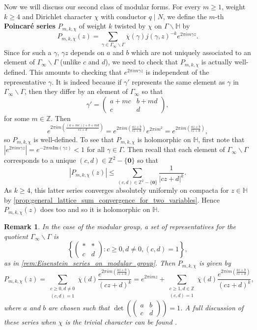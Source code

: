 \documentclass[12pt]{book}
\newtheorem{remark}{Remark}[section]
\theoremstyle{definition}\newframedtheorem{method}{Method}
\newcommand{\Z}{\mathbb{Z}}
\renewcommand{\H}{\mathbb{H}}
\newcommand{\g}{\gamma}
\newcommand{\G}{\Gamma}
\newcommand{\<}{\langle}
\renewcommand{\>}{\rangle}
\newcommand{\conj}{\overline}
\newcommand{\cchi}{\conj{\chi}}
\renewcommand{\Im}{\mathrm{Im}}
\newcommand{\GH}{\G\backslash\H}
\newcommand{\GG}{\G_{\infty}\backslash\G}
\begin{document}
      Now we will discuss our second class of modular forms. For every $m \ge 1$, weight $k \ge 4$ and Dirichlet character $\chi$ with conductor $q \mid N$, we define the $m$-th \textbf{Poincar\'e series} $P_{m,k,\chi}$ of weight $k$ twisted by $\chi$ on $\GH$ by
      \[
        P_{m,k,\chi}(z) = \sum_{\g \in \GG}\cchi(\g)j(\g,z)^{-k}e^{2\pi im\g z}.
      \]
      Since for such a $\g$, $\g z$ depends on $a$ and $b$ which are not uniquely associated to an element of $\GG$ (unlike $c$ and $d$), we need to check that $P_{m,k,\chi}$ is actually well-defined. This amounts to checking that $e^{2\pi im\g z}$ is independent of the representative $\g$. It is indeed because if $\g'$ represents the same element as $\g$ in $\GG$, then they differ by an element of $\G_{\infty}$ so that
      \[
        \g' = \begin{pmatrix} a+mc & b+md \\ c & d \end{pmatrix},
      \]
      for some $m \in \Z$. Then
      \[
        e^{2\pi im\left(\frac{(a+mc)z+b+md}{cz+d}\right)} = e^{2\pi im\left(\frac{az+b}{cz+d}\right)}e^{2\pi im^{2}} = e^{2\pi im\left(\frac{az+b}{cz+d}\right)},
      \]
      so $P_{m,k,\chi}$ is well-defined. To see that $P_{m,k,\chi}$ is holomorphic on $\H$, first note that $|e^{2\pi im\g z}| = e^{-2\pi m\Im(\g z)} < 1$ for all $\g \in \G$. Then recall that each element of $\GG$ corresponds to a unique $(c,d) \in \Z^{2}-\{\mathbf{0}\}$ so that
      \[
        |P_{m,k,\chi}(z)| \le \sum_{(c,d) \in \Z^{2}-\{\mathbf{0}\}}\frac{1}{|cz+d|^{k}}.
      \]
      As $k \ge 4$, this latter series converges absolutely uniformly on compacta for $z \in \H$ by \cref{prop:general_lattice_sum_convergence_for_two_variables}. Hence $P_{m,k,\chi}(z)$ does too and so it is holomorphic on $\H$.

      \begin{remark}
        In the case of the modular group, a set of representatives for the quotient $\GG$ is
       \[
         \left\{\begin{pmatrix} \ast & \ast \\ c & d \end{pmatrix}:c \ge 0, d \neq 0, (c,d) = 1\right\},
       \]
       as in \cref{rem:Eisenstein_series_on_modular_group}. Then $P_{m,k,\chi}$ is given by
        \[
          P_{m,k,\chi}(z) = \sum_{\substack{c \ge 0, d \neq 0 \\ (c,d) = 1}}\cchi(d)\frac{e^{2\pi im\left(\frac{az+b}{cz+d}\right)}}{(cz+d)^{k}} = e^{2\pi imz}+\sum_{\substack{c \ge 1, d \in \Z \\ (c,d) = 1}}\cchi(d)\frac{e^{2\pi im\left(\frac{az+b}{cz+d}\right)}}{(cz+d)^{k}},
        \]
        where $a$ and $b$ are chosen such that $\det\left(\begin{pmatrix} a & b \\ c & d \end{pmatrix}\right) = 1$. A full discussion of these series when $\chi$ is the trivial character can be found \cite{snowden2016lectures}.
      \end{remark}
\end{document}
